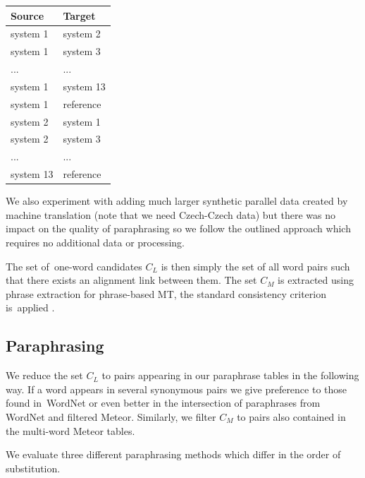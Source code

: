 \documentclass[11pt]{article}
\begin{document}
\begin{center}
\begin{tabular}{ll}
Source & Target \\
\hline
system 1 & system 2 \\
system 1 & system 3 \\
... & ...\\
system 1 & system 13 \\
system 1 & reference \\
system 2 & system 1 \\
system 2 & system 3 \\
... & ... \\
system 13 & reference \\
\end{tabular}
\end{center}

We also experiment with adding much larger synthetic parallel data created by
machine translation (note that we need Czech-Czech data) but there was no 
impact on the quality of paraphrasing so we follow the outlined approach which 
requires no additional data or processing.

The set of~one-word candidates $C_L$ is then simply the set of all word pairs 
such that there exists an alignment link between them. The set $C_M$ is 
extracted using phrase extraction for phrase-based MT, the standard consistency 
criterion is~applied \cite{Och99improvedalignment}.

\subsection{Paraphrasing}
We reduce the set $ C_{L} $ to pairs appearing in our paraphrase tables in the 
following way. If a word appears in several synonymous pairs we give preference 
to those found in~WordNet or even better in the intersection of paraphrases 
from WordNet and filtered Meteor. Similarly, we filter $ C_{M} $ to pairs also 
contained in the multi-word Meteor tables.

We evaluate three different paraphrasing methods which differ in the order of
substitution.
\end{document}
